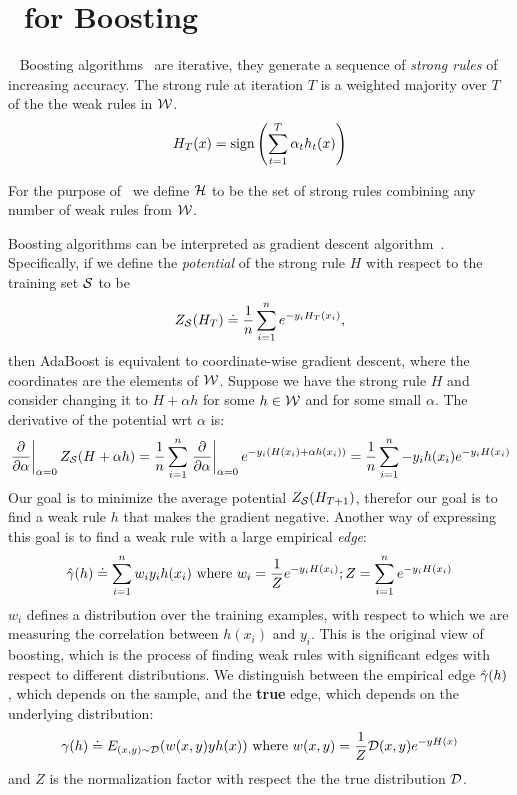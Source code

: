 \section{\tmsn\ for Boosting}~\label{sec:boost}
Boosting algorithms~\cite{schapire_boosting:_2012} are iterative, they generate a
sequence of {\em strong rules} of increasing accuracy. The strong rule
at iteration $T$ is a weighted majority over $T$ of the the weak rules
in $\mathcal{W}$.
$$H_T(x) = \mbox{sign} \left( \sum_{t=1}^T \alpha_t h_t(x) \right)$$

For the purpose of \tmsn\ we define ${\cal H}$ to be the set of
strong rules combining any number of weak rules from $\mathcal{W}$.

Boosting algorithms can be interpreted as gradient descent
algorithm~\cite{mason_boosting_1999}. Specifically, if we define the {\em potential} of
the strong rule $H$ with respect to the training set ${\cal S}$ to be
\[
Z_{{\cal S}}(H_T) \doteq \frac{1}{n} \sum_{i=1}^n e^{- y_i H_T(x_i)},
\]
then AdaBoost is equivalent to coordinate-wise gradient descent,
where the coordinates are the elements of $\mathcal{W}$. Suppose we have the
strong rule $H$ and consider changing it to $H+\alpha h$ for some $h
\in \mathcal{W}$ and for some small $\alpha$. The derivative of the potential
wrt $\alpha$ is:
$$
\left.\frac{\partial}{\partial \alpha}\right|_{\alpha=0} Z_{{\cal S}}(H+\alpha h) =
\frac{1}{n} \sum_{i=1}^n \left.\frac{\partial}{\partial \alpha}\right|_{\alpha=0} e^{ - y_i (H(x_i)+\alpha h(x_i))}
=
\frac{1}{n} \sum_{i=1}^n -y_i h(x_i) e^{- y_i H(x_i)}
$$
Our goal is to minimize the average potential $Z_{{\cal S}}(H_{T+1})$, therefor our goal is to
find a weak rule $h$ that makes the gradient negative. Another way of
expressing this goal is to find a weak rule with a large empirical {\em edge}:
\begin{equation} \label{eqn:gamma_emp}
\hat{\gamma}(h) \doteq  \sum_{i=1}^n w_i y_i h(x_i) \mbox{ where } w_i =
\frac{1}{Z}e^{- y_i H(x_i)}; Z = \sum_{i=1}^n e^{- y_i H(x_i)}
\end{equation}
$w_i$ defines a distribution over the training examples, with respect
to which we are measuring the correlation between $h(x_i)$ and $y_i$.
This is the original view of boosting, which is the
process of finding weak rules with significant edges with respect to
different distributions. We distinguish between the empirical
edge $\hat{\gamma}(h)$, which depends on the sample, and the {\bf true} edge, which
depends on the underlying distribution:
\begin{equation} \label{eqn:gamma_emp}
\gamma(h) \doteq E_{(x,y) \sim {\cal D}}( w(x,y) y h(x)) \mbox{ where }
w(x,y)=\frac{1}{Z} {\cal D}(x,y) e^{- y H(x)}
\end{equation}
and $Z$ is the normalization factor with respect the the true
distribution ${\cal D}$.

